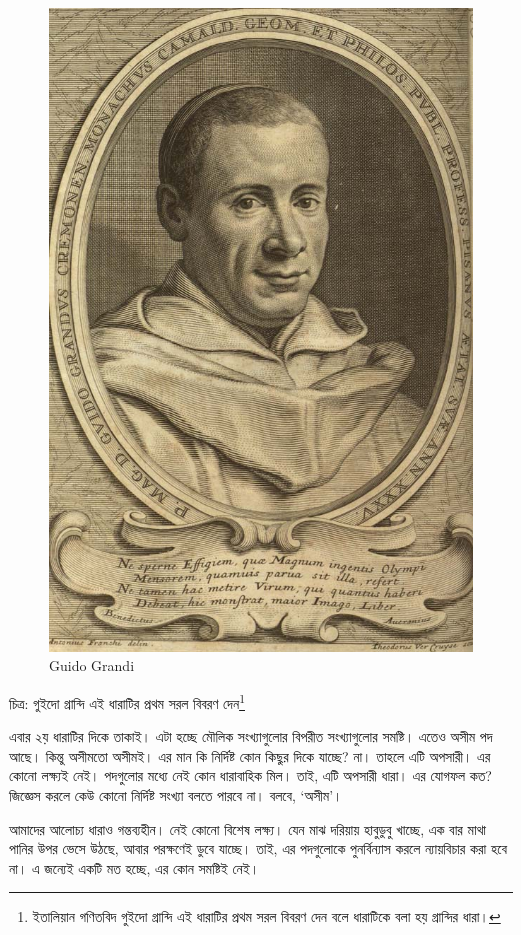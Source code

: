\documentclass[
]{book}
\begin{document}
\begin{figure}

{\centering \includegraphics[width=0.8\linewidth]{img/grandi} 

}

\caption{Guido Grandi}\label{fig:grandi}
\end{figure}

চিত্র: গুইদো গ্রান্দি এই ধারাটির প্রথম সরল বিবরণ দেন\footnote{ইতালিয়ান গণিতবিদ গুইদো গ্রান্দি এই ধারাটির প্রথম সরল বিবরণ দেন বলে ধারাটিকে বলা হয় গ্রান্দির ধারা।}

এবার ২য় ধারাটির দিকে তাকাই। এটা হচ্ছে মৌলিক সংখ্যাগুলোর বিপরীত সংখ্যাগুলোর সমষ্টি। এতেও অসীম পদ আছে। কিন্তু অসীমতো অসীমই। এর মান কি নির্দিষ্ট কোন কিছুর দিকে যাচ্ছে? না। তাহলে এটি অপসারী। এর কোনো লক্ষ্যই নেই। পদগুলোর মধ্যে নেই কোন ধারাবাহিক মিল। তাই, এটি অপসারী ধারা। এর যোগফল কত? জিজ্ঞেস করলে কেউ কোনো নির্দিষ্ট সংখ্যা বলতে পারবে না। বলবে, `অসীম'।

আমাদের আলোচ্য ধারাও গন্তব্যহীন। নেই কোনো বিশেষ লক্ষ্য। যেন মাঝ দরিয়ায় হাবুডুবু খাচ্ছে, এক বার মাথা পানির উপর ভেসে উঠছে, আবার পরক্ষণেই ডুবে যাচ্ছে। তাই, এর পদগুলোকে পুনর্বিন্যাস করলে ন্যায়বিচার করা হবে না। এ জন্যেই একটি মত হচ্ছে, এর কোন সমষ্টিই নেই।
\end{document}
